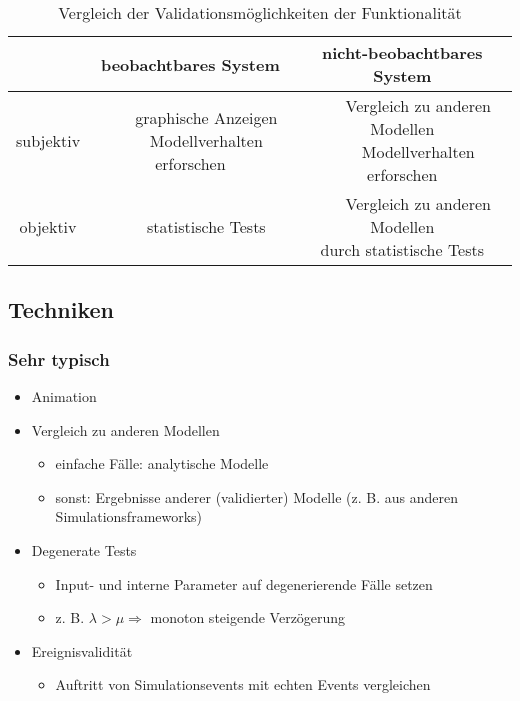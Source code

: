 \documentclass[nonacm=true, language=german]{acmart}
\newcommand{\tabitem}{~~\llap{\textbullet}~~}
\begin{document}
\begin{table}[ht]
    \centering
    \begin{tabular}{c|c c}
        \toprule
                    & beobachtbares System          & nicht-beobachtbares System \\
        \midrule
         subjektiv  & \makecell{
             \tabitem graphische Anzeigen \\
             \tabitem Modellverhalten erforschen
         }          & \makecell{
             \tabitem Vergleich zu anderen Modellen \\
             \tabitem Modellverhalten erforschen
         } \\
         objektiv   & \tabitem statistische Tests   & \makecell{\tabitem Vergleich zu anderen Modellen \\ durch statistische Tests} \\
         \bottomrule
    \end{tabular}
    \caption{Vergleich der Validationsmöglichkeiten der Funktionalität}
    \label{tab:validation_operational}
\end{table}

\newpage

\subsection{Techniken}

\subsubsection{Sehr typisch}
\begin{itemize}
    \item Animation
    \item Vergleich zu anderen Modellen
    \begin{itemize}
        \item einfache Fälle: analytische Modelle
        \item sonst: Ergebnisse anderer  (validierter) Modelle (z. B. aus anderen Simulationsframeworks)
    \end{itemize}
    \item Degenerate Tests
    \begin{itemize}
        \item Input- und interne Parameter auf degenerierende Fälle setzen
        \item z. B. $\lambda > \mu \Rightarrow$ monoton steigende Verzögerung
    \end{itemize}
    \item Ereignisvalidität
    \begin{itemize}
        \item Auftritt von Simulationsevents mit echten Events vergleichen
    \end{itemize}
\end{itemize}
\end{document}
